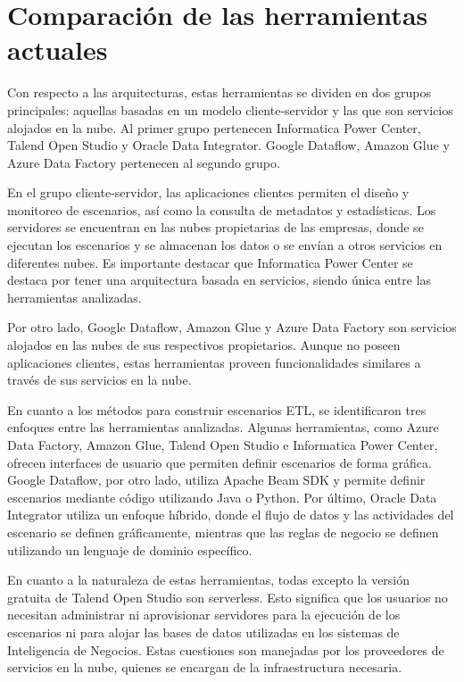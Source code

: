 \section{Comparaci\'on de las herramientas actuales} \label{section:ToolsComparison}

Con respecto a las arquitecturas, estas herramientas se dividen en dos grupos principales: aquellas basadas en un modelo 
cliente-servidor y las que son servicios alojados en la nube. Al primer grupo pertenecen Informatica Power Center, 
Talend Open Studio y Oracle Data Integrator. Google Dataflow, Amazon Glue y Azure Data Factory pertenecen al segundo 
grupo.

En el grupo cliente-servidor, las aplicaciones clientes permiten el diseño y monitoreo de escenarios, así como la 
consulta de metadatos y estadísticas. Los servidores se encuentran en las nubes propietarias de las empresas, donde se 
ejecutan los escenarios y se almacenan los datos o se envían a otros servicios en diferentes nubes. Es importante 
destacar que Informatica Power Center se destaca por tener una arquitectura basada en servicios, siendo única entre las 
herramientas analizadas.

Por otro lado, Google Dataflow, Amazon Glue y Azure Data Factory son servicios alojados en las nubes de sus respectivos 
propietarios. Aunque no poseen aplicaciones clientes, estas herramientas proveen funcionalidades similares a través de sus 
servicios en la nube.

En cuanto a los métodos para construir escenarios ETL, se identificaron tres enfoques entre las herramientas analizadas. 
Algunas herramientas, como Azure Data Factory, Amazon Glue, Talend Open Studio e Informatica Power Center, ofrecen 
interfaces de usuario que permiten definir escenarios de forma gráfica. Google Dataflow, por otro lado, utiliza Apache 
Beam SDK y permite definir escenarios mediante código utilizando Java o Python. Por último, Oracle Data Integrator 
utiliza un enfoque híbrido, donde el flujo de datos y las actividades del escenario se definen gráficamente, mientras 
que las reglas de negocio se definen utilizando un lenguaje de dominio específico.

En cuanto a la naturaleza de estas herramientas, todas excepto la versión gratuita de Talend Open Studio son serverless. 
Esto significa que los usuarios no necesitan administrar ni aprovisionar servidores para la ejecución de los escenarios 
ni para alojar las bases de datos utilizadas en los sistemas de Inteligencia de Negocios. Estas cuestiones son manejadas 
por los proveedores de servicios en la nube, quienes se encargan de la infraestructura necesaria.  
